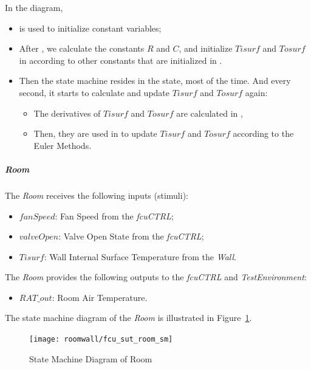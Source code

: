 In the diagram,
\begin{itemize}
    \item {} is used to initialize constant variables;
    \item After , we calculate the constants $R$ and $C$, and initialize $Tisurf$ and $Tosurf$ in  according to other constants that are initialized in . 
    \item Then the state machine resides in the  state, most of the time. And every second, it starts to calculate and update $Tisurf$ and $Tosurf$ again:
        \begin{itemize}
            \item The derivatives of $Tisurf$ and $Tosurf$ are calculated in , 
            \item Then, they are used in  to update $Tisurf$ and $Tosurf$ according to the Euler Methods. 
        \end{itemize}
\end{itemize}

\subparagraph{Room}
The \emph{Room} receives the following inputs (stimuli):
\begin{itemize}
    \item $fanSpeed$: Fan Speed from the \emph{fcuCTRL};
    \item $valveOpen$: Valve Open State from the \emph{fcuCTRL};
    \item $Tisurf$: Wall Internal Surface Temperature from the \emph{Wall}.
\end{itemize}

The \emph{Room} provides the following outputs to the \emph{fcuCTRL} and \emph{TestEnvironment}:
\begin{itemize}
    \item $RAT\_out$: Room Air Temperature.
\end{itemize}

The state machine diagram of the \emph{Room} is illustrated in Figure~\ref{fig:fcu_sut_room_sm}.
\begin{figure}[htb!]
    \centering
	\texttt{[image: roomwall/fcu\_sut\_room\_sm]}
    \caption{State Machine Diagram of Room}
    \label{fig:fcu_sut_room_sm}
\end{figure}

